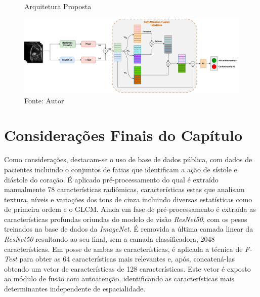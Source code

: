 \begin{figure}[htbp]
    \centering
    \caption{Arquitetura Proposta}
    \includegraphics[width=1\textwidth]{figures/fig011.png}
    \caption*{Fonte: Autor}
    \label{fig:fig011}
\end{figure}

\section{Considerações Finais do Capítulo}
\label{sec:cap4_consideracoes_finais}

Como considerações, destacam-se o uso de base de dados pública, com dados de pacientes incluindo o conjuntos de fatias que identificam a ação de sístole e diástole do coração. É aplicado pré-processamento do qual é extraído manualmente 78 características radiômicas, características estas que analisam textura, níveis e variações dos tons de cinza incluindo diversas estatísticas como de primeira ordem e o \gls{GLCM}. Ainda em fase de pré-processamento é extraída as características profundas oriundas do modelo de visão \textit{ResNet50}, com os pesos treinados na base de dados da \textit{ImageNet}. É removida a última camada linear da \textit{ResNet50} resultando ao seu final, sem a camada classificadora, 2048 características. Em posse de ambas as características, é aplicada a técnica de \textit{F-Test} para obter as 64 características mais relevantes e, após, concatená-las obtendo um vetor de características de 128 características. Este vetor é exposto ao módulo de fusão com autoatenção, identificando as características mais determinantes independente de espacialidade. 